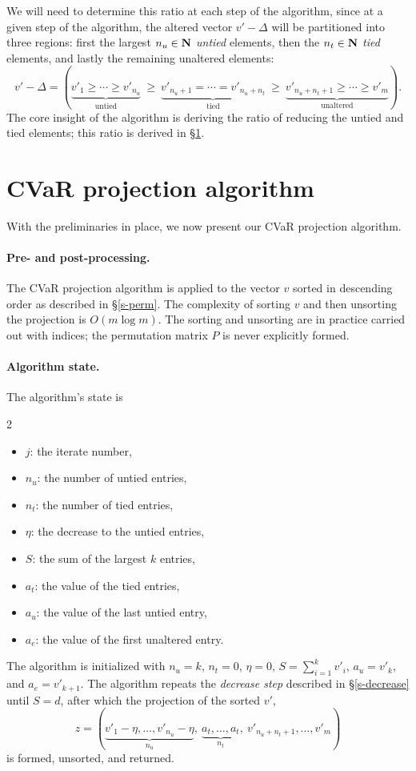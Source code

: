 \documentclass[12pt]{article}
\begin{document}
We will need to determine this ratio at each step of the algorithm, since
at a given step of the algorithm, the altered vector $v'-\Delta$ will be partitioned
into three regions: first the largest $n_u\in{\mbox{\bf N}}$ \emph{untied} elements, then the
$n_t\in{\mbox{\bf N}}$ \emph{tied} elements, and lastly the remaining unaltered elements:
\[
    v'-\Delta = \left(\underbrace{v'_1 \geq \cdots \geq v'_{n_u}}_{\text{untied}} 
    ~\geq~\underbrace{v'_{n_u+1}=\cdots=v'_{n_u+n_t}}_{\text{tied}}
    ~\geq~\underbrace{v'_{n_u+n_t+1}\geq \cdots\geq v'_m}_{\text{unaltered}}\right).
\]
The core insight of the algorithm is deriving the ratio of reducing the untied
and tied elements; this ratio is derived in \S\ref{s-procedure}.

\section{CVaR projection algorithm}\label{s-procedure}
With the preliminaries in place, we now present our CVaR projection algorithm.
\paragraph{Pre- and post-processing.}
The CVaR projection algorithm is applied to the vector $v$ sorted in descending
order as described in \S\ref{s-perm}. The complexity of sorting $v$ and then unsorting
the projection is $O(m\log m)$. The sorting and unsorting are in practice carried
out with indices; the permutation matrix $P$ is never explicitly formed.

\paragraph{Algorithm state.}
The algorithm's state is
\begin{multicols}{2}
\begin{itemize}
    \item $j$: the iterate number,
    \item $n_u$: the number of untied entries,
    \item $n_t$: the number of tied entries,
    \item $\eta$: the decrease to the untied entries,
    \item $S$: the sum of the largest $k$ entries,
    \item $a_t$: the value of the tied entries,
    \item $a_u$: the value of the last untied entry, 
    \item $a_e$: the value of the first unaltered entry.
\end{itemize}
\end{multicols}
The algorithm is initialized with $n_u=k$, $n_t=0$, $\eta=0$,
$S=\sum_{i=1}^k v'_i$, $a_u=v'_k$, and $a_e=v'_{k+1}$.
The algorithm repeats the \textit{decrease step} described in \S\ref{s-decrease}
until $S = d$, after which the projection of the sorted $v'$,
\[
    z = \left(
        \underbrace{v'_1-\eta, \ldots, v'_{n_u}-\eta}_{n_u}, ~\underbrace{a_t, \ldots, a_t}_{n_t}, ~v'_{n_u+n_t+1}, \ldots, v'_m
    \right)
\] 
is formed, unsorted, and returned.
\end{document}
